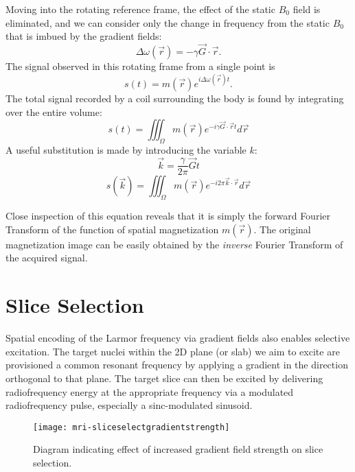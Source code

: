 Moving into the rotating reference frame, the effect of the static $B_0$ field is eliminated, and we can consider only the change in frequency from the static $B_0$ that is imbued by the gradient fields:
\begin{equation}
\Delta\omega(\vec{r}) = -\gamma\vec{G}\cdot\vec{r}.
\end{equation}
The signal observed in this rotating frame from a single point is
\begin{equation}
s(t) = m(\vec{r})e^{i\Delta\omega(\vec{r})t}.
\end{equation}
The total signal recorded by a coil surrounding the body is found by integrating over the entire volume:
\begin{equation}
s(t) = \iiint_{\Omega}m(\vec{r})e^{-i\gamma \vec{G}\cdot\vec{r}t}d\vec{r}
\end{equation}
A useful substitution is made by introducing the variable $k$:
\begin{equation}
\vec{k} = \frac{\gamma}{2\pi} \vec{G}t
\end{equation}
\begin{equation}
s(\vec{k}) = \iiint_{\Omega}m(\vec{r})e^{-i2\pi \vec{k}\cdot\vec{r}}d\vec{r}
\end{equation}

Close inspection of this equation reveals that it is simply the forward Fourier Transform of the function of spatial magnetization $m(\vec{r})$. The original magnetization image can be easily obtained by the \textit{inverse} Fourier Transform of the acquired signal.
\section{Slice Selection}
Spatial encoding of the Larmor frequency via gradient fields also enables selective excitation. The target nuclei within the 2D plane (or slab) we aim to excite are provisioned a common resonant frequency by applying a gradient in the direction orthogonal to that plane. The target slice can then be excited by delivering radiofrequency energy at the appropriate frequency via a modulated radiofrequency pulse, especially a sinc-modulated sinusoid. 
\begin{figure}[ht]
	\centering
	
		\texttt{[image: mri-sliceselectgradientstrength]}
		
	\caption{Diagram indicating effect of increased gradient field strength on slice selection.}\label{fig:mri:sliceselectgradstrength}
\end{figure} 


